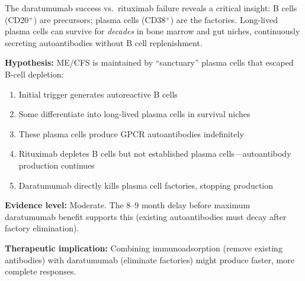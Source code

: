 \begin{hypothesis}
\label{hyp:plasma-cell-sanctuary}
The daratumumab success vs.\ rituximab failure reveals a critical insight: B cells (CD20$^+$) are precursors; plasma cells (CD38$^+$) are the factories. Long-lived plasma cells can survive for \textit{decades} in bone marrow and gut niches, continuously secreting autoantibodies without B cell replenishment.

\textbf{Hypothesis:} ME/CFS is maintained by ``sanctuary'' plasma cells that escaped B-cell depletion:
\begin{enumerate}
    \item Initial trigger generates autoreactive B cells
    \item Some differentiate into long-lived plasma cells in survival niches
    \item These plasma cells produce GPCR autoantibodies indefinitely
    \item Rituximab depletes B cells but not established plasma cells---autoantibody production continues
    \item Daratumumab directly kills plasma cell factories, stopping production
\end{enumerate}

\textbf{Evidence level:} Moderate. The 8--9 month delay before maximum daratumumab benefit supports this (existing autoantibodies must decay after factory elimination).

\textbf{Therapeutic implication:} Combining immunoadsorption (remove existing antibodies) with daratumumab (eliminate factories) might produce faster, more complete responses.
\end{hypothesis}

